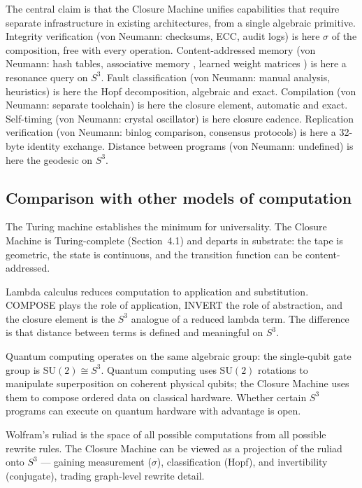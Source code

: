 \documentclass[12pt,a4paper]{article}
\begin{document}
The central claim is that the Closure Machine unifies capabilities that require separate infrastructure in existing architectures, from a single algebraic primitive. Integrity verification (von Neumann: checksums, ECC, audit logs) is here $\sigma$ of the composition, free with every operation. Content-addressed memory (von Neumann: hash tables, associative memory \cite{hopfield1982}, learned weight matrices \cite{vaswani2017}) is here a resonance query on $S^3$. Fault classification (von Neumann: manual analysis, heuristics) is here the Hopf decomposition, algebraic and exact. Compilation (von Neumann: separate toolchain) is here the closure element, automatic and exact. Self-timing (von Neumann: crystal oscillator) is here closure cadence. Replication verification (von Neumann: binlog comparison, consensus protocols) is here a 32-byte identity exchange. Distance between programs (von Neumann: undefined) is here the geodesic on $S^3$.

\subsection{Comparison with other models of computation}

The Turing machine \cite{turing1936} establishes the minimum for universality. The Closure Machine is Turing-complete (Section~4.1) and departs in substrate: the tape is geometric, the state is continuous, and the transition function can be content-addressed.

Lambda calculus \cite{church1936} reduces computation to application and substitution. COMPOSE plays the role of application, INVERT the role of abstraction, and the closure element is the $S^3$ analogue of a reduced lambda term. The difference is that distance between terms is defined and meaningful on $S^3$.

Quantum computing operates on the same algebraic group: the single-qubit gate group is $\mathrm{SU}(2) \cong S^3$. Quantum computing uses $\mathrm{SU}(2)$ rotations to manipulate superposition on coherent physical qubits; the Closure Machine uses them to compose ordered data on classical hardware. Whether certain $S^3$ programs can execute on quantum hardware with advantage is open.

Wolfram's ruliad \cite{wolfram2020} is the space of all possible computations from all possible rewrite rules. The Closure Machine can be viewed as a projection of the ruliad onto $S^3$ --- gaining measurement ($\sigma$), classification (Hopf), and invertibility (conjugate), trading graph-level rewrite detail.
\end{document}
